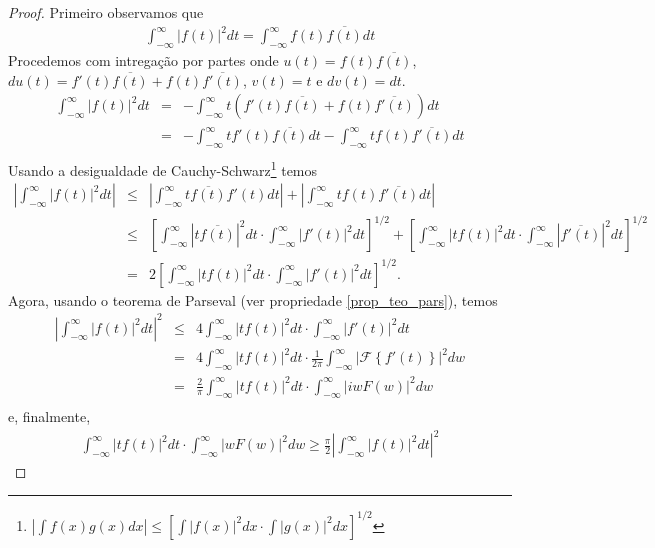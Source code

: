 \begin{proof}
Primeiro observamos que
\begin{eqnarray*}
\int_{-\infty}^\infty |f(t)|^2dt = \int_{-\infty}^\infty f(t) \overline{f(t)}dt
\end{eqnarray*}
Procedemos com intregação por partes onde $u(t)=f(t) \overline{f(t)}$, $du(t)=f'(t) \overline{f(t)}+f(t) \overline{f'(t)}$, $v(t)=t$ e $dv(t)=dt$.
\begin{eqnarray*}
\int_{-\infty}^\infty |f(t)|^2dt &=& -\int_{-\infty}^\infty t\left(f'(t) \overline{f(t)}+f(t) \overline{f'(t)}\right)dt\\
&=&-\int_{-\infty}^\infty tf'(t) \overline{f(t)}dt-\int_{-\infty}^\infty tf(t) \overline{f'(t)}dt\\
\end{eqnarray*}
Usando a desigualdade de Cauchy-Schwarz\footnote{$\left|\int f(x)g(x)dx\right|\leq \left[\int|f(x)|^2dx \cdot \int|g(x)|^2dx\right]^{1/2} $} temos
\begin{eqnarray*}
\left|\int_{-\infty}^\infty |f(t)|^2dt\right| &\leq &\left|\int_{-\infty}^\infty t \overline{f(t)} f'(t)dt\right|+\left|\int_{-\infty}^\infty tf(t) \overline{f'(t)}dt\right|\\
&\leq &\left[\int_{-\infty}^\infty  | t\overline{f(t)}|^2dt\cdot \int_{-\infty}^\infty  | f'(t)|^2dt\right]^{1/2}+\left[\int_{-\infty}^\infty  | tf(t)|^2dt\cdot \int_{-\infty}^\infty  | \overline{f'(t)}|^2dt\right]^{1/2}\\
&=&2\left[\int_{-\infty}^\infty  | tf(t)|^2dt\cdot \int_{-\infty}^\infty  | f'(t)|^2dt\right]^{1/2}.
\end{eqnarray*}
Agora, usando o teorema de Parseval (ver propriedade \ref{prop_teo_pars}), temos
\begin{eqnarray*}
\left|\int_{-\infty}^\infty |f(t)|^2dt\right|^2 &\leq & 4\int_{-\infty}^\infty  | tf(t)|^2dt\cdot \int_{-\infty}^\infty  | f'(t)|^2dt\\
&=&4\int_{-\infty}^\infty  | tf(t)|^2dt\cdot \frac{1}{2\pi}\int_{-\infty}^\infty \left|\mathcal{F}\left\{ f'(t)\right\}\right|^2dw\\
&=&\frac{2}{\pi}\int_{-\infty}^\infty  | tf(t)|^2dt\cdot \int_{-\infty}^\infty \left|iw F(w)\right|^2dw\\
\end{eqnarray*}
e, finalmente,
\begin{eqnarray*}
\int_{-\infty}^\infty  | tf(t)|^2dt\cdot \int_{-\infty}^\infty \left|w F(w)\right|^2dw \geq \frac{\pi}{2}
\left|\int_{-\infty}^\infty |f(t)|^2dt\right|^2 
\end{eqnarray*}
\end{proof}



